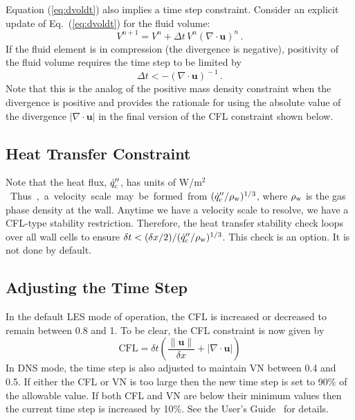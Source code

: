 Equation (\ref{eq:dvoldt}) also implies a time step constraint.  Consider an explicit update of Eq.~(\ref{eq:dvoldt}) for the fluid volume:
\begin{equation}
V^{n+1} = V^n + \Delta t \, V^n (\nabla\cdot\mathbf{u})^{\!n} \,\mbox{.}
\end{equation}
If the fluid element is in compression (the divergence is negative), positivity of the fluid volume requires the time step to be limited by
\begin{equation}
\label{eq:volumedtrestriction}
\Delta t < -(\nabla\cdot\mathbf{u})^{\!-1} \,\mbox{.}
\end{equation}
Note that this is the analog of the positive mass density constraint when the divergence is positive and provides the rationale for using the absolute value of the divergence $|\nabla\cdot\mathbf{u}|$ in the final version of the CFL constraint shown below.

\subsection{Heat Transfer Constraint}

Note that the heat flux, $\dot{q}''_{\rm c}$, has units of \si{W/m$^2$}.  Thus, a velocity scale may be formed from $(\dot{q}''_{\rm c}/\rho_{\rm w})^{1/3}$, where $\rho_{\rm w}$ is the gas phase density at the wall. Anytime we have a velocity scale to resolve, we have a CFL-type stability restriction. Therefore, the heat transfer stability check loops over all wall cells to ensure $\delta t < (\delta x/2) / (\dot{q}''_{\rm c}/\rho_{\rm w})^{1/3}$.  This check is an option. It is not done by default.

\subsection{Adjusting the Time Step}

In the default LES mode of operation, the CFL is increased or decreased to remain between 0.8 and 1.  To be clear, the CFL constraint is now given by
\begin{equation}
\mbox{CFL} = \delta t \left( \frac{\|\mathbf{u}\|}{\delta x} + |\nabla\cdot\mathbf{u}| \right)
\end{equation}
In DNS mode, the time step is also adjusted to maintain VN between 0.4 and 0.5. If either the CFL or VN is too large then the new time step is set to 90\% of the allowable value.  If both CFL and VN are below their minimum values then the current time step is increased by 10\%.  See the User's Guide~\cite{FDS_Users_Guide} for details.




